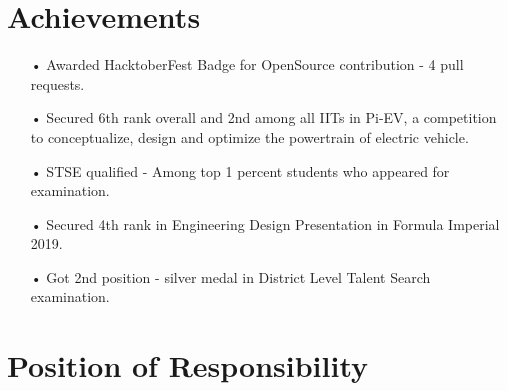 \documentclass[a3paper,12pt]{article}
\begin{document}


\section{\textbf{Achievements}}
\begin{itemize}[nosep,after=\strut, leftmargin=1em, itemsep=3pt]
    \item[•] Awarded HacktoberFest Badge for OpenSource contribution - 4 pull requests.
    \item[•] Secured 6th rank overall and 2nd among all IITs in Pi-EV, a competition to conceptualize, design and optimize the powertrain of electric vehicle.
    \item[•] STSE qualified - Among top 1 percent students who appeared for examination.
    \item[•] Secured 4th rank in Engineering Design Presentation in Formula Imperial 2019.
    \item[•] Got 2nd position - silver medal in District Level Talent Search examination.
\end{itemize}








\section{\textbf{Position of Responsibility}}
\end{document}
